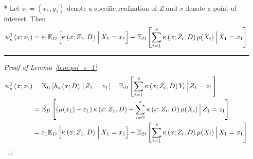 \begin{lem}\label{lem:psi_s_1}\mbox{}\\*
	Let $z_1 = (x_1, y_1)$ denote a specific realization of $Z$ and $x$ denote a point of interest.
	Then
	\begin{equation}
		\psi_{s}^{1}\left(x; z_1\right)
		= \varepsilon_1 \mathbb{E}_D\left[\kappa\left(x; Z_1, D\right)\, \Big| \, X_1 = x_1 \right]
		+ \mathbb{E}_{D}\left[\sum_{i = 1}^{s} \kappa\left(x; Z_{i}, D\right) \mu(X_{i})\, \Big| \, X_1 = x_1 \right]
	\end{equation}
\end{lem}
\hrule
\begin{proof}[Proof of Lemma~\ref{lem:psi_s_1}]
	\begin{equation}
		\begin{aligned}
			\psi_{s}^{1}\left(x; z_1\right)
			 & = \mathbb{E}_{D}\left[h_{s}\left(x; D\right) \, | \, Z_1 = z_1 \right]
			= \mathbb{E}_{D}\left[\sum_{i = 1}^{s} \kappa\left(x; Z_{i}, D\right) Y_{i} \, \Big| \, Z_1 = z_1 \right] \\
			 & = \mathbb{E}_{D}\left[\left(\mu(x_1) + \varepsilon_1\right)\kappa\left(x; Z_1, D\right)
			+ \sum_{i = 2}^{s} \kappa\left(x; Z_{i}, D\right) \mu(X_{i})\, \Big| \, Z_1 = z_1 \right]         \\
			 & = \varepsilon_1 \mathbb{E}_D\left[\kappa\left(x; Z_1, D\right)\, \Big| \, X_1 = x_1 \right]
			+ \mathbb{E}_{D}\left[\sum_{i = 1}^{s} \kappa\left(x; Z_{i}, D\right) \mu(X_{i})\, \Big| \, X_1 = x_1 \right]
		\end{aligned}
	\end{equation}
\end{proof}
